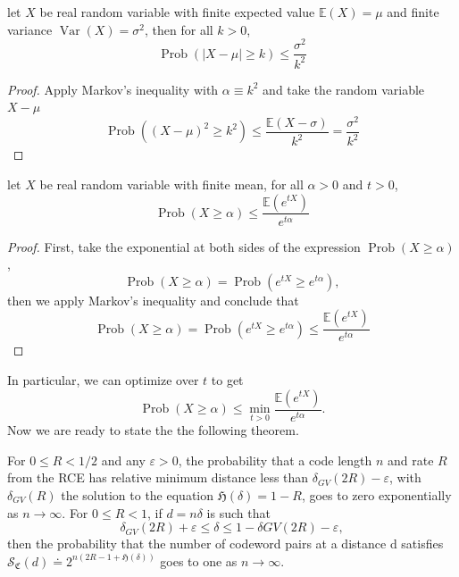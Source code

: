 \begin{lemma}
let $X$ be real random variable with finite expected value $\mathbb{E}(X)=\mu$ and finite variance $\operatorname{Var}(X) = \sigma^2$, then for all $k >0$,
\begin{equation}
\operatorname{Prob}(|X-\mu|\geq k)\leq \frac{\sigma^2}{k^2}
\end{equation}
\end{lemma}

\begin{proof}
Apply Markov's inequality with $\alpha \equiv k^2$ and take the random variable $X-\mu$
\begin{equation}
\operatorname{Prob}\left((X-\mu)^2\geq k^2\right)\leq \frac{\mathbb{E}(X-\sigma)}{k^2} = \frac{\sigma^2}{k^2}
\end{equation}
\end{proof}

\begin{lemma}
let $X$ be real random variable with finite mean, for all $\alpha>0$ and $t>0$,
\begin{equation}
\operatorname{Prob}(X\geq \alpha)\leq \frac{\mathbb{E}(e^{t X})}{e^{t\alpha }}
\end{equation}
\end{lemma}
\begin{proof}
First, take the exponential at both sides of the expression $\operatorname{Prob}(X\geq \alpha)$,
\begin{equation}
\operatorname{Prob}(X\geq \alpha) = \operatorname{Prob}(e^{tX}\geq e^{t\alpha}),
\end{equation}
then we apply Markov's inequality and conclude that
\begin{equation}
\operatorname{Prob}(X\geq \alpha)= \operatorname{Prob}(e^{tX}\geq e^{t\alpha})\leq \frac{\mathbb{E}(e^{t X})}{e^{t\alpha }}
\end{equation}
\end{proof}
In particular, we can optimize over $t$ to get
 \begin{equation}
\operatorname{Prob}(X\geq \alpha)\leq \min_{t>0} \frac{\mathbb{E}(e^{t X})}{e^{t\alpha }}.
\end{equation}
Now we are ready to state the the following theorem\cite{barg_random_2002}.

\begin{theorem}
For $0\leq R< 1/2$ and any $\varepsilon>0$, the probability that a code length $n$ and rate $R$ from the RCE has relative minimum distance less than $\delta_{GV}(2R)-\varepsilon$, with $\delta_{GV}(R) $ the solution to the equation $\mathfrak{H}(\delta) = 1-R$, goes to zero exponentially as $n\to \infty$. For $0\leq R < 1$, if $d=n\delta$ is such that
\begin{equation}
\delta_{GV}(2R)+\varepsilon \leq \delta \leq 1- \delta{GV}(2R) - \varepsilon,
\end{equation}
then the probability that the number of codeword pairs at a distance d satisfies $\mathcal{S}_{\mathfrak{C}}(d) \doteq 2^{n(2 R-1+\mathfrak{H}(\delta))}$ goes to one as $n\to \infty$.
\end{theorem}

